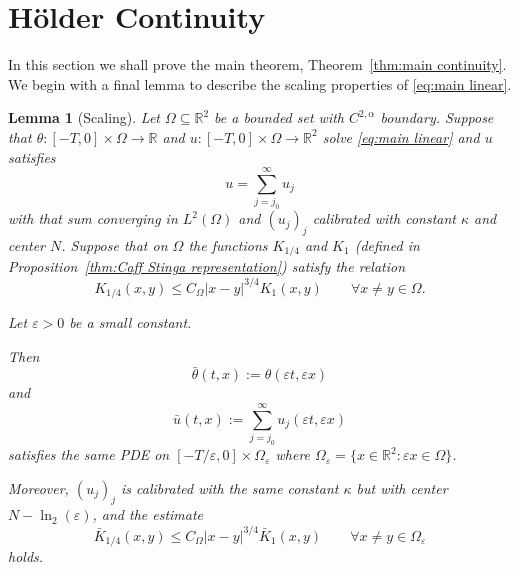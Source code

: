 \documentclass[11pt]{amsart}
\newtheorem{lemma}[theorem]{Lemma}
\theoremstyle{remark}
\theoremstyle{definition}
\newcommand{\R}{\mathbb{R}}
\newcommand{\eps}{\varepsilon}
\newcommand{\norm}[1]{\left\lVert#1\right\rVert}
\newcommand{\Comega}{C_\Omega}
\begin{document}

\section{H\"{o}lder Continuity} \label{sec:holder}

In this section we shall prove the main theorem, Theorem~\ref{thm:main continuity}.  We begin with a final lemma to describe the scaling properties of \eqref{eq:main linear}.  

\begin{lemma}[Scaling] \label{thm:scaling}
Let $\Omega \subseteq \R^2$ be a bounded set with $C^{2,\alpha}$ boundary.  Suppose that $\theta:[-T,0] \times \Omega \to \R$ and $u:[-T,0]\times \Omega \to \R^2$ solve \eqref{eq:main linear} and $u$ satisfies
\[ u = \sum_{j=j_0}^\infty u_j \]
with that sum converging in $L^2(\Omega)$ and $(u_j)_j$ calibrated with constant $\kappa$ and center $N$.  Suppose that on $\Omega$ the functions $K_{1/4}$ and $K_1$ (defined in Proposition~\ref{thm:Caff Stinga representation}) satisfy the relation
\begin{equation} \label{scaling 1/4 to 1 property} K_{1/4}(x,y) \leq \Comega |x-y|^{3/4} K_1(x,y) \qquad \forall x\neq y \in \Omega. \end{equation}

Let $\eps>0$ be a small constant. 

Then
\[ \bar{\theta}(t,x) := \theta(\eps t, \eps x) \]
and
\[ \bar{u}(t,x) := \sum_{j=j_0}^\infty u_j(\eps t, \eps x) \]
satisfies the same PDE on $[-T/\eps, 0]\times \Omega_\eps$ where $\Omega_\eps = \{x \in \R^2: \eps x \in \Omega\}$.  

Moreover, $(u_j)_j$ is calibrated with the same constant $\kappa$ but with center $N - \ln_2(\eps)$, and the estimate
\[ \bar{K}_{1/4}(x,y) \leq \Comega |x-y|^{3/4} \bar{K}_1(x,y) \qquad \forall x\neq y \in \Omega_\eps \]
holds.  

\end{lemma}
\end{document}
